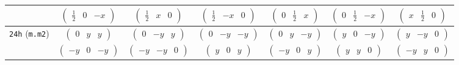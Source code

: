 \documentclass[fleqn,9pt,landscape]{jsarticle}
\begin{document}
\begin{center}
\begin{longtable}{ccccccc}
& $ \begin{pmatrix} \frac{1}{2} & 0 & - x \end{pmatrix} $ & $ \begin{pmatrix} \frac{1}{2} & x & 0 \end{pmatrix} $ & $ \begin{pmatrix} \frac{1}{2} & - x & 0 \end{pmatrix} $ & $ \begin{pmatrix} 0 & \frac{1}{2} & x \end{pmatrix} $ & $ \begin{pmatrix} 0 & \frac{1}{2} & - x \end{pmatrix} $ & $ \begin{pmatrix} x & \frac{1}{2} & 0 \end{pmatrix} $ \\ \hline
{\tt 24h} ({\tt m.m2}) & $ \begin{pmatrix} 0 & y & y \end{pmatrix} $ & $ \begin{pmatrix} 0 & - y & y \end{pmatrix} $ & $ \begin{pmatrix} 0 & - y & - y \end{pmatrix} $ & $ \begin{pmatrix} 0 & y & - y \end{pmatrix} $ & $ \begin{pmatrix} y & 0 & - y \end{pmatrix} $ & $ \begin{pmatrix} y & - y & 0 \end{pmatrix} $ \\
& $ \begin{pmatrix} - y & 0 & - y \end{pmatrix} $ & $ \begin{pmatrix} - y & - y & 0 \end{pmatrix} $ & $ \begin{pmatrix} y & 0 & y \end{pmatrix} $ & $ \begin{pmatrix} - y & 0 & y \end{pmatrix} $ & $ \begin{pmatrix} y & y & 0 \end{pmatrix} $ & $ \begin{pmatrix} - y & y & 0 \end{pmatrix} $ \\ \hline

\end{longtable}
\end{center}
\end{document}
